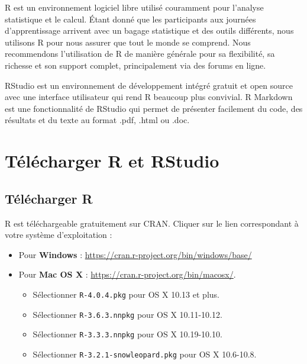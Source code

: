 \documentclass[12pt,]{book}
\providecommand{\tightlist}{%
  \setlength{\itemsep}{0pt}\setlength{\parskip}{0pt}}
\begin{document}
R est un environnement logiciel libre utilisé couramment pour l'analyse statistique et le calcul. Étant donné que les participants aux journées d'apprentissage arrivent avec un bagage statistique et des outils différents, nous utilisons R pour nous assurer que tout le monde se comprend. Nous recommendons l'utilisation de R de manière générale pour sa flexibilité, sa richesse et son support complet, principalement via des forums en ligne.

RStudio est un environnement de développement intégré gratuit et open source avec une interface utilisateur qui rend R beaucoup plus convivial. R Markdown est une fonctionnalité de RStudio qui permet de présenter facilement du code, des résultats et du texte au format .pdf, .html ou .doc.

\hypertarget{tuxe9luxe9charger-r-et-rstudio}{%
\section{Télécharger R et RStudio}\label{tuxe9luxe9charger-r-et-rstudio}}

\hypertarget{tuxe9luxe9charger-r}{%
\subsection{Télécharger R}\label{tuxe9luxe9charger-r}}

R est téléchargeable gratuitement sur CRAN. Cliquer sur le lien correspondant à votre système d'exploitation :

\begin{itemize}
\tightlist
\item
  Pour \textbf{Windows} : \url{https://cran.r-project.org/bin/windows/base/}
\item
  Pour \textbf{Mac OS X} : \url{https://cran.r-project.org/bin/macosx/}.

  \begin{itemize}
  \tightlist
  \item
    Sélectionner \texttt{R-4.0.4.pkg} pour OS X 10.13 et plus.
  \item
    Sélectionner \texttt{R-3.6.3.nnpkg} pour OS X 10.11-10.12.
  \item
    Sélectionner \texttt{R-3.3.3.nnpkg} pour OS X 10.19-10.10.
  \item
    Sélectionner \texttt{R-3.2.1-snowleopard.pkg} pour OS X 10.6-10.8.
  \end{itemize}
\end{itemize}
\end{document}
